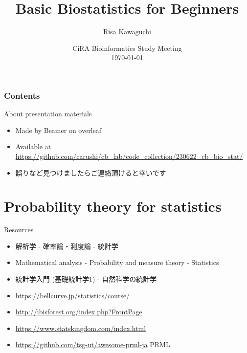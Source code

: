 \documentclass[cjk, aspectratio=169]{beamer}
\def\meetingname{CiRA Bioinformatics Study Meeting}
\begin{document}
\title[Beamer]{Basic Biostatistics for Beginners}
\author[RK]{Risa Kawaguchi} 
\date[\mydate]{\meetingname\\\today}



\begin{frame}
\titlepage
\end{frame}


\begin{frame}
\frametitle{Contents}
\tableofcontents
\end{frame}

\begin{frame}{About presentation materials}
\begin{itemize}
\item Made by Beamer on overleaf
\item Available at \url{https://github.com/carushi/cb_lab/code_collection/230622_cb_bio_stat/}
\item 誤りなど見つけましたらご連絡頂けると幸いです
\end{itemize}
\end{frame}

\section{Probability theory for statistics}
\begin{frame}{Resources}
\begin{itemize}
\item 解析学 - 確率論・測度論 - 統計学
\item Mathematical analysis - Probability and measure theory - Statistics
\item 統計学入門 (基礎統計学1) - 自然科学の統計学
\item \url{https://bellcurve.jp/statistics/course/}
\item \url{http://ibisforest.org/index.php?FrontPage}
\item \url{https://www.statskingdom.com/index.html}
\item \url{https://github.com/tsg-ut/awesome-prml-ja} PRML
\end{itemize}
\end{frame}
\end{document}
